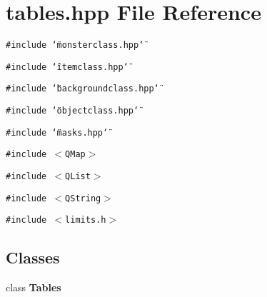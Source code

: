 \section{tables.hpp File Reference}
\label{tables_8hpp}
{\tt \#include \char`\"{}monsterclass.hpp\char`\"{}}\par
{\tt \#include \char`\"{}itemclass.hpp\char`\"{}}\par
{\tt \#include \char`\"{}backgroundclass.hpp\char`\"{}}\par
{\tt \#include \char`\"{}objectclass.hpp\char`\"{}}\par
{\tt \#include \char`\"{}masks.hpp\char`\"{}}\par
{\tt \#include $<$QMap$>$}\par
{\tt \#include $<$QList$>$}\par
{\tt \#include $<$QString$>$}\par
{\tt \#include $<$limits.h$>$}\par
\subsection*{Classes}
\begin{CompactItemize}
\item 
class {\bf Tables}
\end{CompactItemize}
